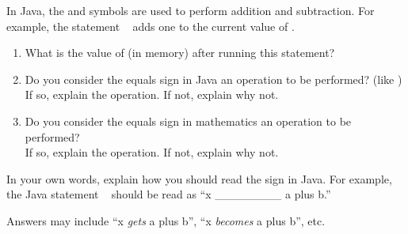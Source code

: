 \Q In Java, the \java{+} and \java{-} symbols are used to perform addition and subtraction. For example, the statement ~ adds one to the current value of .

\begin{enumerate}

\item What is the value of  (in memory) after running this statement?

\item Do you consider the equals sign in Java an operation to be performed? (like \java{+})
\\ If so, explain the operation. If not, explain why not.


\item Do you consider the equals sign in mathematics an operation to be performed?
\\ If so, explain the operation. If not, explain why not.


\end{enumerate}


\Q In your own words, explain how you should read the \java{=} sign in Java.
For example, the Java statement ~ should be read as ``x \_\_\_\_\_\_\_\_ a plus b.''

\begin{answer}
Answers may include ``x \emph{gets} a plus b'', ``x \emph{becomes} a plus b'', etc.
\end{answer}
